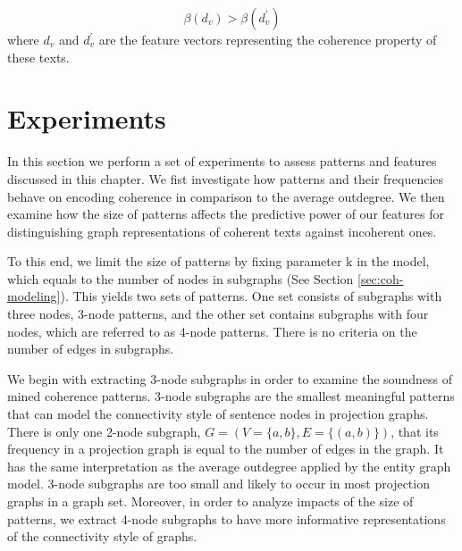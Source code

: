 \begin{equation}
\beta (d_v) > \beta (d^\prime_v)
\end{equation}
where $d_v$ and $d^\prime_v$ are the feature vectors representing the coherence property of these texts. 

\section{Experiments}
\label{sec:exp}

In this section we perform a set of experiments to assess patterns and features discussed in this chapter. 
We fist investigate how patterns and their frequencies behave on encoding coherence in comparison to the average outdegree.  
We then examine how the size of patterns affects the predictive power of our features for distinguishing graph representations of coherent texts against incoherent ones. 

To this end, we limit the size of patterns by fixing parameter k in the model, which equals to the number of nodes in subgraphs (See Section \ref{sec:coh-modeling}). 
This yields two sets of patterns. 
One set consists of subgraphs with three nodes, 3-node patterns, and the other set contains subgraphs with four nodes, which are referred to as 4-node patterns.  
There is no criteria on the number of edges in subgraphs.  

We begin with extracting 3-node subgraphs in order to examine the soundness of mined coherence patterns.  
3-node subgraphs are the smallest meaningful patterns that can model the connectivity style of sentence nodes in projection graphs. 
There is only one 2-node subgraph, $G = \left( V = \lbrace a,b \rbrace, E=\lbrace \left( a, b \right) \rbrace \right)$, that its frequency in a projection graph is equal to the number of edges in the graph. 
It has the same interpretation as the average outdegree applied by the entity graph model.  
3-node subgraphs are too small and likely to occur in most projection graphs in a graph set. 
Moreover, in order to analyze impacts of the size of patterns, we extract 4-node subgraphs to have more informative representations of the connectivity style of graphs. 

